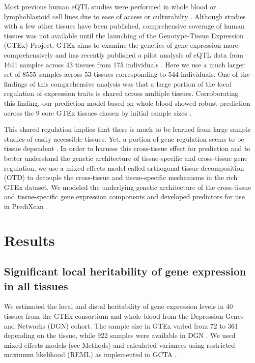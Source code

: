\documentclass[10pt,letterpaper]{article}
\begin{document}
Most previous human eQTL studies were performed in whole blood or lymphoblastoid cell lines due to ease of access or culturabilty \cite{Stranger_2007,Cheung_2005,Battle_2013}. Although studies with a few other tissues have been published, comprehensive coverage of human tissues was not available until the launching of the Genotype-Tissue Expression (GTEx) Project. GTEx aims to examine the genetics of gene expression more comprehensively and has recently published a pilot analysis of eQTL data from 1641 samples across 43 tissues from 175 individuals \cite{Ardlie_2015}. Here we use a much larger set of 8555 samples across 53 tissues corresponding to 544 individuals. One of the findings of this comprehensive analysis was that a large portion of the local regulation of expression traits is shared across multiple tissues. Corroborating this finding, our prediction model based on whole blood showed robust prediction across the 9 core GTEx tissues chosen by initial sample sizes \cite{Gamazon_2015}.

This shared regulation implies that there is much to be learned from large sample studies of easily accessible tissues. Yet, a portion of gene regulation seems to be tissue dependent \cite{Ardlie_2015}. In order to harness this cross-tissue effect for prediction and to better understand the genetic architecture of tissue-specific and cross-tissue gene regulation, we use a mixed effects model called orthogonal tissue decomposition (OTD) to decouple the cross-tissue and tissue-specific mechanisms in the rich GTEx dataset. We modeled the underlying genetic architecture of the cross-tissue and tissue-specific gene expression components and developed predictors for use in PrediXcan \cite{Gamazon_2015}.



\section*{Results}
\subsection*{Significant local heritability of gene expression in all tissues}\label{local-genetic-variation-can-be-well-characterized-for-all-tissues}

We estimated the local and distal heritability of gene expression levels in 40 tissues from the GTEx consortium and whole blood from the Depression Genes and Networks (DGN) cohort. The sample size in GTEx varied from 72 to 361 depending on the tissue, while 922 samples were available in DGN \cite{Battle_2013}. We used mixed-effects models (see Methods) and calculated variances using restricted maximum likelihood (REML) as implemented in GCTA \cite{Yang_2011}.
\end{document}
